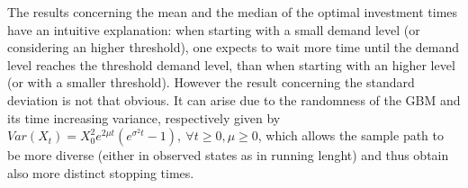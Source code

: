 The results concerning the mean and the median of the optimal investment times have an intuitive explanation: when starting with a small demand level (or considering an higher threshold), one expects to wait more time until the demand level reaches the threshold demand level, than when starting with an higher level (or with a smaller threshold). However the result concerning the standard deviation is not that obvious. It can arise due to the randomness of the GBM and its time increasing variance, respectively given by $Var(X_t)=X_0^2 e^{2\mu t}(e^{\sigma^2 t} -1), \ \forall t\geq0, \mu \geq 0$, which allows the sample path to be more diverse (either in observed states as in running lenght) and thus obtain also more distinct stopping times.
\pagebreak

